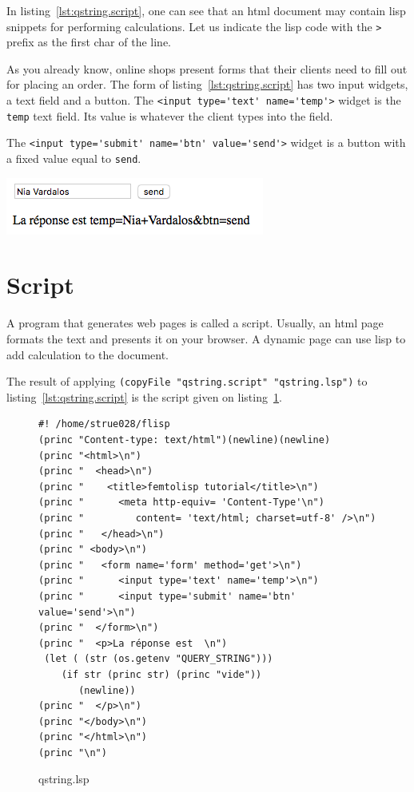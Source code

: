 \documentclass[a4paper,12pt]{book}
\begin{document}
In listing~\ref{lst:qstring.script}, one can see
that an html document may contain lisp
snippets for performing calculations. Let us
indicate the lisp code with the \verb|>| prefix
as the first char of the line.

As you already know, online shops
present forms that their clients need to fill out
for placing an order. The form of
listing~\ref{lst:qstring.script}
has two input widgets, a text field and
a button. The \verb|<input type='text' name='temp'>|
widget is the \verb|temp| text field.
Its value is whatever the client types into the field.

The \verb|<input type='submit' name='btn' value='send'>|
widget is a button with a fixed value equal to \verb|send|.

\includegraphics[scale=0.5]{figs/form.png}

\section{Script}
A program that generates
web pages is called a script.
Usually, an html page formats the text
and presents it on your browser.
A dynamic page can use lisp to add
calculation to the document.

The result of applying 
\verb|(copyFile "qstring.script" "qstring.lsp")|
to  listing~\ref{lst:qstring.script}
is the script given on listing~\ref{lst:qstring.lsp}.

\begin{figure}[!h]
\begin{verbatim}
#! /home/strue028/flisp
(princ "Content-type: text/html")(newline)(newline)
(princ "<html>\n")
(princ "  <head>\n")
(princ "    <title>femtolisp tutorial</title>\n")
(princ "      <meta http-equiv= 'Content-Type'\n")
(princ "         content= 'text/html; charset=utf-8' />\n")
(princ "   </head>\n")
(princ " <body>\n")
(princ "   <form name='form' method='get'>\n")
(princ "      <input type='text' name='temp'>\n")
(princ "      <input type='submit' name='btn' value='send'>\n")
(princ "  </form>\n")
(princ "  <p>La réponse est  \n")
 (let ( (str (os.getenv "QUERY_STRING")))
    (if str (princ str) (princ "vide"))
       (newline))
(princ "  </p>\n")
(princ "</body>\n")
(princ "</html>\n")
(princ "\n")
\end{verbatim}
\caption{qstring.lsp}
\label{lst:qstring.lsp}
\end{figure}
\end{document}
